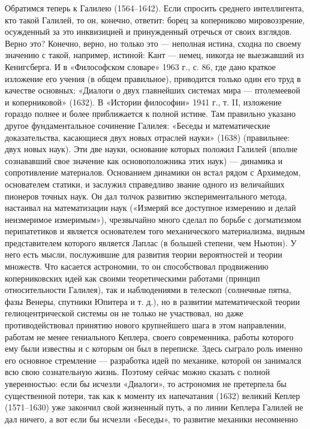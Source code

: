 Обратимся теперь к Галилею (1564--1642). Если спросить среднего
интеллигента, кто такой Галилей, то он, конечно, ответит: борец за
коперниково мировоззрение, осужденный за это инквизицией и принужденный
отречься от своих взглядов. Верно это? Конечно, верно, но только это ---
неполная истина, сходна по своему значению с такой, например, истиной: Кант ---
немец, никогда не выезжавший из Кенигсберга. И в «Философском словаре» 1963 г.,
с. 86, где дано краткое изложение его учения (в общем правильное),
приводится только один его труд в качестве основных: «Диалоги о двух
главнейших системах мира --- птолемеевой и коперниковой» (1632). В «Истории
философии» 1941 г., т. II, изложение гораздо полнее и более приближается к
полной истине. Там правильно указано другое фундаментальное сочинение
Галилея: «Беседы и математические доказательства, касающиеся двух новых
отраслей науки» (1638) (правильнее: двух новых наук). Эти две науки,
основание которых положил Галилей (вполне сознававший свое значение как
основоположника этих наук) --- динамика и сопротивление материалов.
Основанием динамики он встал рядом с Архимедом, основателем статики, и
заслужил справедливо звание одного из величайших пионеров точных наук. Он дал
толчок развитию экспериментального метода, настаивал на математизации наук
(«Измеряй все доступное измерению и делай неизмеримое измеримым»),
чрезвычайно много сделал по борьбе с догматизмом перипатетиков и является
основателем того механического материализма, видным представителем которого
является Лаплас (в большей степени, чем Ньютон). У него есть мысли,
послужившие для развития теории вероятностей и теории множеств. Что
касается астрономии, то он способствовал продвижению коперниковских идей как
своими теоретическими работами (принцип
относительности Галилея), так и наблюдениями в телескоп (солнечные пятна,
фазы Венеры, спутники Юпитера и т. д.), но в развитии математической теории
гелиоцентрической системы он не только не участвовал, но даже
противодействовал принятию нового крупнейшего шага в этом направлении,
работам не менее гениального Кеплера, своего современника, работы которого ему
были известны и с которым он был в переписке. Здесь сыграло роль именно его
основное стремление --- разработка идей по механике, которой он занимался всю
свою сознательную жизнь. Поэтому сейчас можно сказать с полной
уверенностью: если бы исчезли «Диалоги», то астрономия не претерпела бы
существенной потери, так как к моменту их напечатания (1632) великий Кеплер
(1571--1630) уже закончил свой жизненный путь, а по линии Кеплера Галилей не дал
ничего, а вот если бы исчезли «Беседы», то развитие механики несомненно
